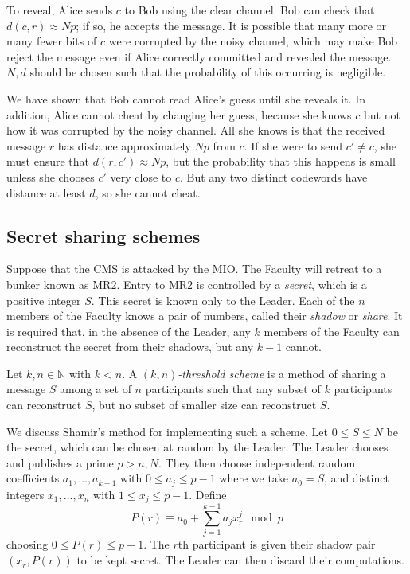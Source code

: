 To reveal, Alice sends \( c \) to Bob using the clear channel.
Bob can check that \( d(c,r) \approx Np \); if so, he accepts the message.
It is possible that many more or many fewer bits of \( c \) were corrupted by the noisy channel, which may make Bob reject the message even if Alice correctly committed and revealed the message.
\( N, d \) should be chosen such that the probability of this occurring is negligible.

We have shown that Bob cannot read Alice's guess until she reveals it.
In addition, Alice cannot cheat by changing her guess, because she knows \( c \) but not how it was corrupted by the noisy channel.
All she knows is that the received message \( r \) has distance approximately \( Np \) from \( c \).
If she were to send \( c' \neq c \), she must ensure that \( d(r,c') \approx Np \), but the probability that this happens is small unless she chooses \( c' \) very close to \( c \).
But any two distinct codewords have distance at least \( d \), so she cannot cheat.

\subsection{Secret sharing schemes}
Suppose that the CMS is attacked by the MIO.
The Faculty will retreat to a bunker known as MR2.
Entry to MR2 is controlled by a \emph{secret}, which is a positive integer \( S \).
This secret is known only to the Leader.
Each of the \( n \) members of the Faculty knows a pair of numbers, called their \emph{shadow} or \emph{share}.
It is required that, in the absence of the Leader, any \( k \) members of the Faculty can reconstruct the secret from their shadows, but any \( k-1 \) cannot.
\begin{definition}
    Let \( k, n \in \mathbb N \) with \( k < n \).
    A \emph{\( (k, n) \)-threshold scheme} is a method of sharing a message \( S \) among a set of \( n \) participants such that any subset of \( k \) participants can reconstruct \( S \), but no subset of smaller size can reconstruct \( S \).
\end{definition}
We discuss Shamir's method for implementing such a scheme.
Let \( 0 \leq S \leq N \) be the secret, which can be chosen at random by the Leader.
The Leader chooses and publishes a prime \( p > n, N \).
They then choose independent random coefficients \( a_1, \dots, a_{k-1} \) with \( 0 \leq a_j \leq p-1 \) where we take \( a_0 = S \), and distinct integers \( x_1, \dots, x_n \) with \( 1 \leq x_j \leq p-1 \).
Define
\[ P(r) \equiv a_0 + \sum_{j=1}^{k-1} a_j x_r^j \mod p \]
choosing \( 0 \leq P(r) \leq p-1 \).
The \( r \)th participant is given their shadow pair \( (x_r, P(r)) \) to be kept secret.
The Leader can then discard their computations.

